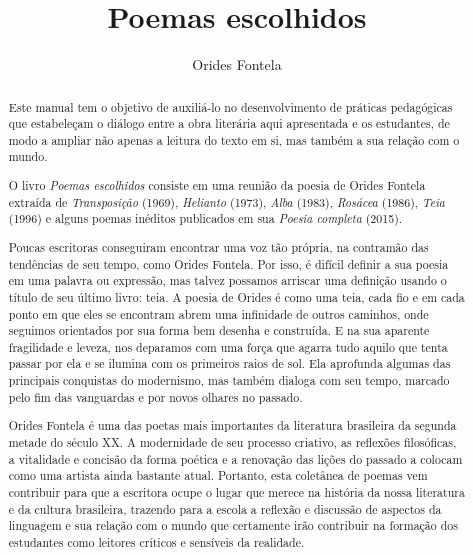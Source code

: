 \documentclass[12pt]{extarticle}
\begin{document}
\newcommand{\AutorLivro}{Orides Fontela}
\newcommand{\TituloLivro}{Poemas escolhidos}
\newcommand{\Tema}{Ficção, mistério e fantasia}
\newcommand{\Genero}{Poema}
\newcommand{\imagemCapa}{./images/PNLD0030-01.png}
\newcommand{\issnppub}{---}
\newcommand{\issnepub}{---}
\newcommand{\colaborador}{\textbf{Rodrigo Ribeiro Neves} é uma pessoa incrível e vai fazer um bom serviço.}


\title{\TituloLivro}
\author{\AutorLivro}
\def\authornotes{\colaborador}

\date{}
\maketitle

\begin{abstract}
Este manual tem o objetivo de auxiliá-lo no desenvolvimento de práticas
pedagógicas que estabeleçam o diálogo entre a obra literária aqui
apresentada e os estudantes, de modo a ampliar não apenas a leitura do
texto em si, mas também a sua relação com o mundo.

O livro \emph{Poemas escolhidos} consiste em uma reunião da poesia de
Orides Fontela extraída de \emph{Transposição} (1969), \emph{Helianto}
(1973), \emph{Alba} (1983), \emph{Rosácea} (1986), \emph{Teia} (1996) e
alguns poemas inéditos publicados em sua \emph{Poesia completa} (2015).

Poucas escritoras conseguiram encontrar uma voz tão própria, na
contramão das tendências de seu tempo, como Orides Fontela. Por isso, é
difícil definir a sua poesia em uma palavra ou expressão, mas talvez
possamos arriscar uma definição usando o título de seu último livro:
teia. A poesia de Orides é como uma teia, cada fio e em cada ponto em
que eles se encontram abrem uma infinidade de outros caminhos, onde
seguimos orientados por sua forma bem desenha e construída. E na sua
aparente fragilidade e leveza, nos deparamos com uma força que agarra
tudo aquilo que tenta passar por ela e se ilumina com os primeiros raios
de sol. Ela aprofunda algumas das principais conquistas do modernismo,
mas também dialoga com seu tempo, marcado pelo fim das vanguardas e por
novos olhares no passado.

Orides Fontela é uma das poetas mais importantes da literatura
brasileira da segunda metade do século XX. A modernidade de seu processo
criativo, as reflexões filosóficas, a vitalidade e concisão da forma
poética e a renovação das lições do passado a colocam como uma artista
ainda bastante atual. Portanto, esta coletânea de poemas vem contribuir
para que a escritora ocupe o lugar que merece na história da nossa
literatura e da cultura brasileira, trazendo para a escola a reflexão e
discussão de aspectos da linguagem e sua relação com o mundo que
certamente irão contribuir na formação dos estudantes como leitores
críticos e sensíveis da realidade.



\end{abstract}
\end{document}
